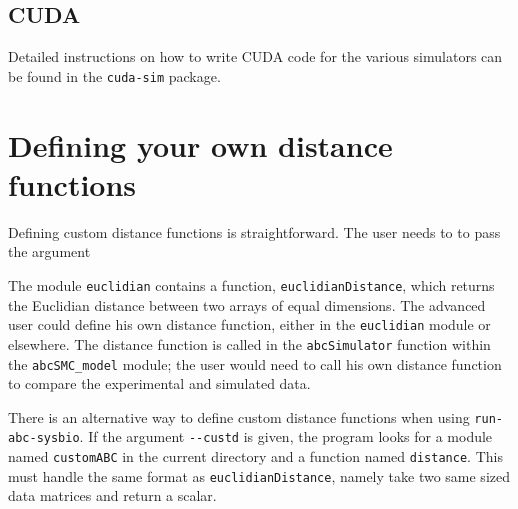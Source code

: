 \documentclass[a4paper]{report}
\begin{document}
\subsection{CUDA}
Detailed instructions on how to write CUDA code for the various simulators can be found in the \verb$cuda-sim$ package.

\section{Defining your own distance functions}
Defining custom distance functions is straightforward. The user needs to to pass the argument 

The module \verb$euclidian$ contains a function, \verb$euclidianDistance$, which returns the Euclidian distance between two arrays of equal dimensions. The advanced user could define his own distance function, either in the \verb$euclidian$ module or elsewhere. The distance function is called in the \verb$abcSimulator$ function within the \verb$abcSMC_model$ module; the user would need to call his own distance function to compare the experimental and simulated data.

There is an alternative way to define custom distance functions when using \verb$run-abc-sysbio$. If the argument \verb$--custd$ is given, the program looks for a module named \verb$customABC$ in the current directory and a function named \verb$distance$. This must handle the same format as \verb$euclidianDistance$, namely take two same sized data matrices and return a scalar.


\end{document}
